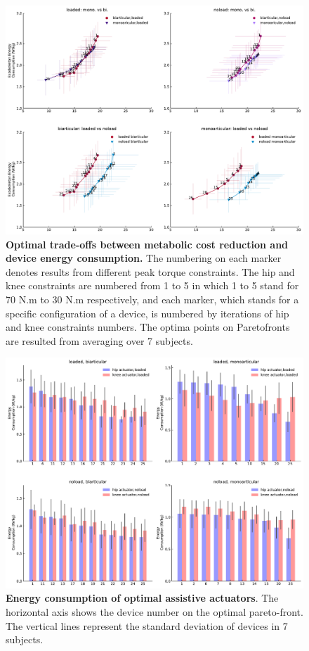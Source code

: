 \documentclass[10pt,letterpaper]{article}
\begin{document}
\begin{figure}[ht]   
	\centering
	\includegraphics[width=\linewidth]{Pareto_Simulations_Figures/PaperFigure_Main_Pareto.pdf}
	\vspace{1mm}
	\caption{{\small\textbf{Optimal trade-offs between metabolic cost reduction and device energy consumption.} The numbering on each marker denotes results from different peak torque constraints. The hip and knee constraints are numbered from 1 to 5 in which 1 to 5 stand for 70 N.m to 30 N.m respectively, and each marker, which stands for a specific configuration of a device, is numbered by iterations of hip and knee constraints numbers. The optima points on Paretofronts are resulted from averaging over 7 subjects.}}
	\label{Fig_Main_Paretofronts}
\end{figure}
\begin{figure}[ht]   
	\centering
	\includegraphics[width=\linewidth]{Pareto_Simulations_Figures/PaperFigure_Paretofront_EnergyBarPlot.pdf}
	\vspace{1mm}
	\caption{{\small\textbf{Energy consumption of optimal assistive actuators}. The horizontal axis shows the device number on the optimal pareto-front. The vertical lines represent the standard deviation of devices in 7 subjects.}}
	\label{Fig_Paretofronts_Actuators_EnergyBarPlot}
\end{figure}
\end{document}
